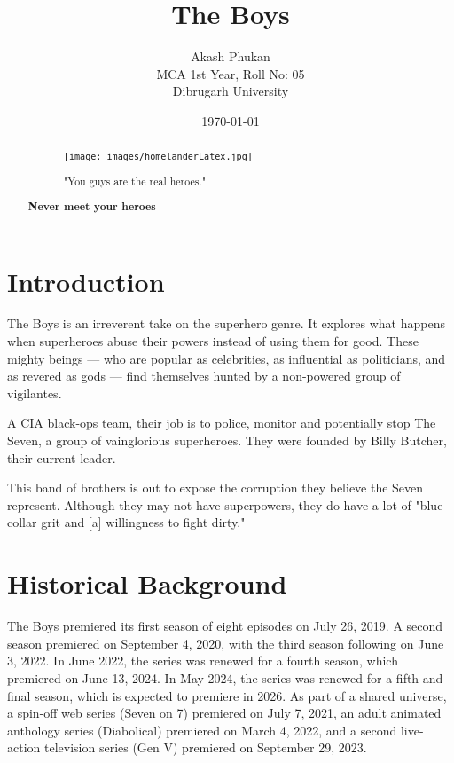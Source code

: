 \documentclass[12pt]{article}
\title{\textbf{The Boys}}
\author{Akash Phukan \\ MCA 1st Year, Roll No: 05 \\ Dibrugarh University}
\date{\today}
\begin{document}
\maketitle
\newpage
\begin{abstract}
\begin{figure}
    \centering
    \texttt{[image: images/homelanderLatex.jpg]}
    \caption{"You guys are the real heroes."}
    \label{fig:enter-label}
\end{figure}
\vfill
\centering \textbf{\Large Never meet your heroes}
\end{abstract}
\newpage
\section{Introduction}
The Boys is an irreverent take on the superhero genre. It explores what happens when superheroes abuse their powers instead of using them for good. These mighty beings — who are popular as celebrities, as influential as politicians, and as revered as gods — find themselves hunted by a non-powered group of vigilantes.

A CIA black-ops team, their job is to police, monitor and potentially stop The Seven, a group of vainglorious superheroes. They were founded by Billy Butcher, their current leader.

This band of brothers is out to expose the corruption they believe the Seven represent. Although they may not have superpowers, they do have a lot of "blue-collar grit and [a] willingness to fight dirty."



\section{Historical Background}
The Boys premiered its first season of eight episodes on July 26, 2019. A second season premiered on September 4, 2020, with the third season following on June 3, 2022. In June 2022, the series was renewed for a fourth season, which premiered on June 13, 2024. In May 2024, the series was renewed for a fifth and final season, which is expected to premiere in 2026. As part of a shared universe, a spin-off web series (Seven on 7) premiered on July 7, 2021, an adult animated anthology series (Diabolical) premiered on March 4, 2022, and a second live-action television series (Gen V) premiered on September 29, 2023.
\newpage
\end{document}
